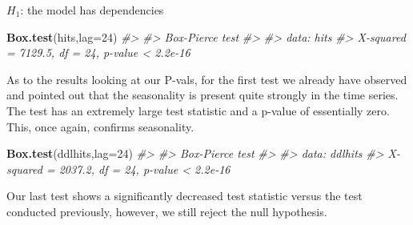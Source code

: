 \documentclass[]{article}
\newenvironment{Shaded}{\begin{snugshade}}{\end{snugshade}}
\newcommand{\CommentTok}[1]{\textcolor[rgb]{0.56,0.35,0.01}{\textit{#1}}}
\newcommand{\DataTypeTok}[1]{\textcolor[rgb]{0.13,0.29,0.53}{#1}}
\newcommand{\DecValTok}[1]{\textcolor[rgb]{0.00,0.00,0.81}{#1}}
\newcommand{\KeywordTok}[1]{\textcolor[rgb]{0.13,0.29,0.53}{\textbf{#1}}}
\newcommand{\NormalTok}[1]{#1}
\begin{document}
\(H_1\): the model has dependencies

\begin{Shaded}
\begin{Highlighting}[]
\KeywordTok{Box.test}\NormalTok{(hits,}\DataTypeTok{lag=}\DecValTok{24}\NormalTok{)}
\CommentTok{#> }
\CommentTok{#>  Box-Pierce test}
\CommentTok{#> }
\CommentTok{#> data:  hits}
\CommentTok{#> X-squared = 7129.5, df = 24, p-value < 2.2e-16}
\end{Highlighting}
\end{Shaded}

As to the results looking at our P-vals, for the first test we already
have observed and pointed out that the seasonality is present quite
strongly in the time series. The test has an extremely large test
statistic and a p-value of essentially zero. This, once again, confirms
seasonality.

\begin{Shaded}
\begin{Highlighting}[]
\KeywordTok{Box.test}\NormalTok{(ddlhits,}\DataTypeTok{lag=}\DecValTok{24}\NormalTok{)}
\CommentTok{#> }
\CommentTok{#>  Box-Pierce test}
\CommentTok{#> }
\CommentTok{#> data:  ddlhits}
\CommentTok{#> X-squared = 2037.2, df = 24, p-value < 2.2e-16}
\end{Highlighting}
\end{Shaded}

Our last test shows a significantly decreased test statistic versus the
test conducted previously, however, we still reject the null hypothesis.
\end{document}
